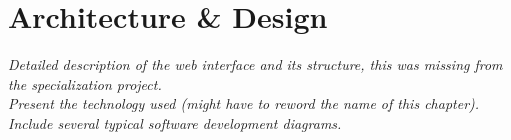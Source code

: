 
\chapter{Architecture \& Design}

\textit{Detailed description of the web interface and its structure, this was missing from the specialization project. \\
\noindent Present the technology used (might have to reword the name of this chapter). \\
\noindent Include several typical software development diagrams.}

\cleardoublepage